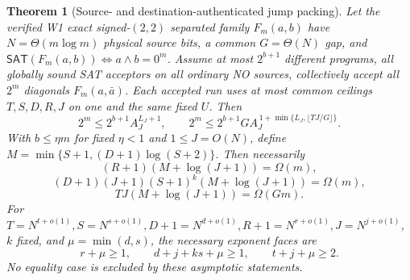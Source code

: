 \documentclass[11pt]{article}
\newtheorem{theorem}{Theorem}
\newcommand{\SAT}{\mathsf{SAT}}
\begin{document}
\begin{theorem}[Source- and destination-authenticated jump packing]
\label{th:packing}
Let the verified W1 exact signed-$(2,2)$ separated family
$F_m(a,b)$ have $N=\Theta(m\log m)$ physical source bits,
a common $G=\Theta(N)$ gap, and
$\SAT(F_m(a,b))\iff a\wedge b=0^m$.
Assume at most $2^{b+1}$ different programs, all globally
sound SAT acceptors on \emph{all ordinary NO sources},
collectively accept all $2^m$ diagonals $F_m(a,\bar a)$.
Each accepted run uses at most common ceilings $T,S,D,R,J$ on
one and the same fixed $U$. Then
\[
 \boxed{2^m\le 2^{b+1}A_J^{L_J+1}},\qquad
 \boxed{2^m\le 2^{b+1}G
 A_J^{\,1+\min\{L_J,\lfloor TJ/G\rfloor\}}}.       \tag{1}
\]
With $b\le\eta m$ for fixed $\eta<1$ and $1\le J=O(N)$,
define
$M=\min\{S+1,(D+1)\log(S+2)\}$. Then necessarily
\[
 \boxed{(R+1)(M+\log(J+1))=\Omega(m)},                 \tag{2}
\]
\[
 \boxed{(D+1)(J+1)(S+1)^k(M+\log(J+1))=\Omega(m)},   \tag{3}
\]
\[
 \boxed{TJ(M+\log(J+1))=\Omega(Gm)}.                  \tag{4}
\]
For $T=N^{t+o(1)},S=N^{s+o(1)},D+1=N^{d+o(1)},
R+1=N^{r+o(1)},J=N^{j+o(1)}$, $k$ fixed, and
$\mu=\min(d,s)$, the necessary exponent faces are
\[
 \boxed{r+\mu\ge1,\qquad d+j+ks+\mu\ge1,\qquad
 t+j+\mu\ge2}.                                     \tag{5}
\]
No equality case is excluded by these asymptotic statements.
\end{theorem}
\end{document}
